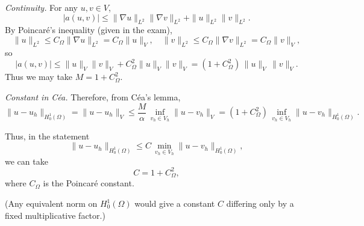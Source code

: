 \emph{Continuity.}
For any \(u,v\in V\),
\[
    |a(u,v)|
    \le \|\nabla u\|_{L^2}\|\nabla v\|_{L^2}
    + \|u\|_{L^2}\|v\|_{L^2}.
\]
By Poincaré's inequality (given in the exam),
\[
    \|u\|_{L^2} \le C_\Omega\|\nabla u\|_{L^2} = C_\Omega\|u\|_V,
    \quad
    \|v\|_{L^2} \le C_\Omega\|\nabla v\|_{L^2} = C_\Omega\|v\|_V,
\]
so
\[
    |a(u,v)|
    \le \|u\|_V\|v\|_V + C_\Omega^2 \|u\|_V\|v\|_V
    = (1+C_\Omega^2)\,\|u\|_V\,\|v\|_V.
\]
Thus we may take \(M = 1 + C_\Omega^2\).

\emph{Constant in Céa.}
Therefore, from Céa's lemma,
\[
    \|u-u_h\|_{H^1_0(\Omega)}
    = \|u-u_h\|_V
    \le \frac{M}{\alpha}\,\inf_{v_h\in V_h}\|u-v_h\|_V
    = (1+C_\Omega^2)\,\inf_{v_h\in V_h}\|u-v_h\|_{H^1_0(\Omega)}.
\]

Thus, in the statement
\[
    \|u-u_h\|_{H^1_0(\Omega)} \le C\,\min_{v_h\in V_h}\|u-v_h\|_{H^1_0(\Omega)},
\]
we can take
\[
    \boxed{C = 1 + C_\Omega^2,}
\]
where \(C_\Omega\) is the Poincaré constant.

(Any equivalent norm on \(H^1_0(\Omega)\) would give a constant \(C\) differing only by a
fixed multiplicative factor.)
